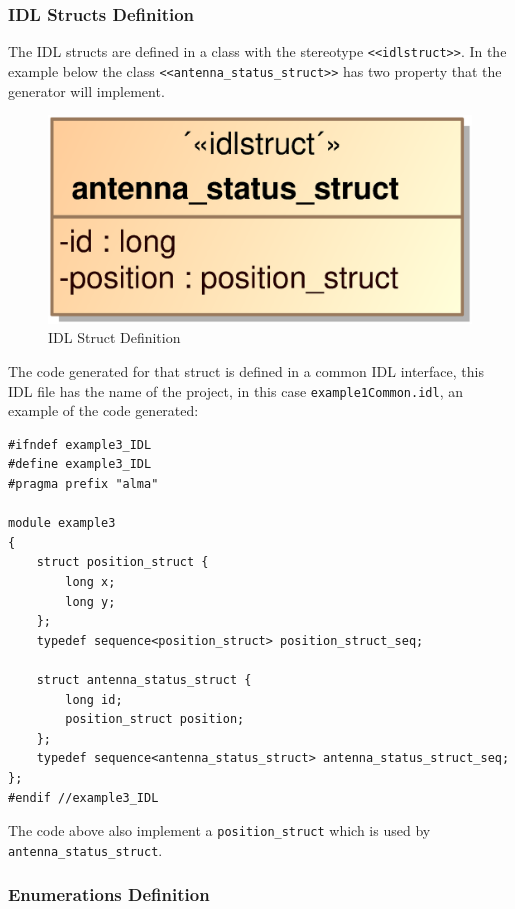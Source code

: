 \subsubsection{IDL Structs Definition}

The IDL structs are defined in a class with the stereotype \verb+<<idlstruct>>+.
In the example below the class \verb+<<antenna_status_struct>>+ has two property
that the generator will implement.

\begin{figure}[h!t]
\begin{center}
\includegraphics[scale=0.2]{images/idlstructb}
\caption{\label{fig:vs_diag}IDL Struct Definition}
\end{center}
\end{figure} 

The code generated for that struct is defined in a common IDL interface, this
IDL file has the name of the project, in this case \verb+example1Common.idl+,
an example of the code generated:

\begin{center}
\begin{verbatim}
#ifndef example3_IDL
#define example3_IDL
#pragma prefix "alma"

module example3
{
    struct position_struct {
        long x;
        long y;
    };
    typedef sequence<position_struct> position_struct_seq;
	
    struct antenna_status_struct {
        long id;
        position_struct position;
    };
    typedef sequence<antenna_status_struct> antenna_status_struct_seq;
};
#endif //example3_IDL
\end{verbatim}
\end{center}

The code above also implement a  \verb+position_struct+ which is used by
\verb+antenna_status_struct+.

\subsubsection{Enumerations Definition}

